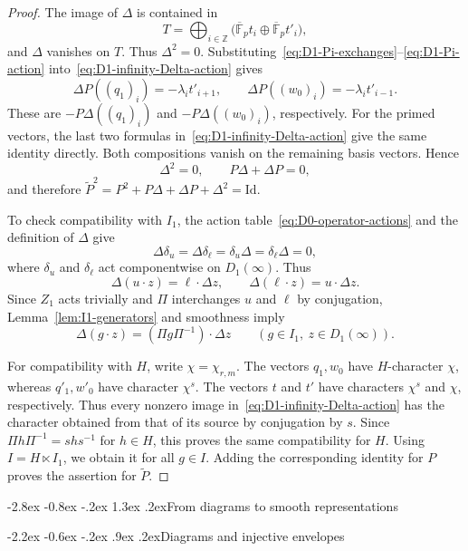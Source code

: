 \documentclass[10pt]{article}
\makeatletter
\renewcommand\section{\@startsection{section}{1}{\z@}%
  {-2.8ex \@plus -0.8ex \@minus -.2ex}%
  {1.3ex \@plus .2ex}{\normalfont\Large\bfseries}}
\renewcommand\subsection{\@startsection{subsection}{2}{\z@}%
  {-2.2ex \@plus -0.6ex \@minus -.2ex}%
  {.9ex \@plus .2ex}{\normalfont\large\bfseries}}
\theoremstyle{plain}
\theoremstyle{definition}
\theoremstyle{remark}
\newcommand{\Fpbar}{\overline{\mathbb{F}}_p}
\newcommand{\Id}{\mathrm{Id}}
\makeatother
\begin{document}
\begin{proof}
The image of $\Delta$ is contained in
\[
T=\bigoplus_{i\in\mathbb{Z}}\bigl(\Fpbar t_i\oplus\Fpbar t'_i\bigr),
\]
and $\Delta$ vanishes on $T$. Thus $\Delta^2=0$. Substituting~\eqref{eq:D1-Pi-exchanges}--\eqref{eq:D1-Pi-action} into~\eqref{eq:D1-infinity-Delta-action} gives
\[
\Delta P((q_1)_i)=-\lambda_i t'_{i+1},\qquad
\Delta P((w_0)_i)=-\lambda_i t'_{i-1}.
\]
These are $-P\Delta((q_1)_i)$ and $-P\Delta((w_0)_i)$, respectively. For the primed vectors, the last two formulas in~\eqref{eq:D1-infinity-Delta-action} give the same identity directly. Both compositions vanish on the remaining basis vectors. Hence
\begin{equation}\label{eq:D1-infinity-Delta-identities}
\Delta^2=0,\qquad P\Delta+\Delta P=0,
\end{equation}
and therefore $\widetilde P^2=P^2+P\Delta+\Delta P+\Delta^2=\Id$.

To check compatibility with $I_1$, the action table~\eqref{eq:D0-operator-actions} and the definition of $\Delta$ give
\[
\Delta\delta_u=\Delta\delta_{\ell}
=\delta_u\Delta=\delta_{\ell}\Delta=0,
\]
where $\delta_u$ and $\delta_{\ell}$ act componentwise on $D_1(\infty)$. Thus
\[
\Delta(u\cdot z)=\ell\cdot\Delta z,\qquad
\Delta(\ell\cdot z)=u\cdot\Delta z.
\]
Since $Z_1$ acts trivially and $\Pi$ interchanges $u$ and $\ell$ by conjugation, Lemma~\ref{lem:I1-generators} and smoothness imply
\[
\Delta(g\cdot z)=(\Pi g\Pi^{-1})\cdot\Delta z
\qquad(g\in I_1,\ z\in D_1(\infty)).
\]

For compatibility with $H$, write $\chi=\chi_{r,m}$. The vectors $q_1,w_0$ have $H$-character $\chi$, whereas $q'_1,w'_0$ have character $\chi^s$. The vectors $t$ and $t'$ have characters $\chi^s$ and $\chi$, respectively. Thus every nonzero image in~\eqref{eq:D1-infinity-Delta-action} has the character obtained from that of its source by conjugation by $s$. Since $\Pi h\Pi^{-1}=shs^{-1}$ for $h\in H$, this proves the same compatibility for $H$. Using $I=H\ltimes I_1$, we obtain it for all $g\in I$. Adding the corresponding identity for $P$ proves the assertion for $\widetilde P$.
\end{proof}

\section{From diagrams to smooth representations}\label{sec:diagram-realization}

\subsection{Diagrams and injective envelopes}
\end{document}
